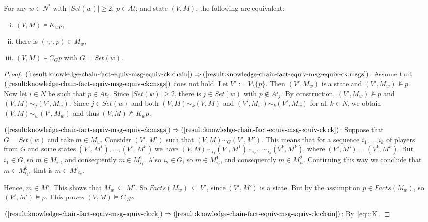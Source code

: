 \documentclass{article}
\newcommand{\abs}[1]{\lvert#1\rvert}
\newcounter{#1}
\newcommand{\sse}{\mbox{$\:\subseteq\:$}}
\newcommand{\LL}{\mbox{$\ldots$}}
\newcommand{\state}[1][]{\ensuremath{(V#1,M#1)}\xspace}
\newcommand{\setof}[1]{\ensuremath{\mathit{Set}(#1)}\xspace}
\newcommand{\msg}[3]{\ensuremath{(#1,#2,#3)}\xspace}
\newcommand{\bits}{\ensuremath{At}\xspace}
\newcommand{\knows}[1]{\ensuremath{K_{#1}}\xspace}
\newcommand{\ck}[1]{\ensuremath{C_{#1}}\xspace}\newcommand{\Facts}{\mathit{Facts}}
\begin{document}
\begin{lemma}
  \label{result:knowledge-chain-fact-equiv-msg-equiv-ck}
  For any $w\in N^*$ with $\abs{\setof w}\geq2$,
  $p\in\bits$, and state \state,
  the following are equivalent:
  \begin{enumerate}[(i)]
  \item\label{result:knowledge-chain-fact-equiv-msg-equiv-ck:chain}
    $\state\vDash \knows wp$,\item\label{result:knowledge-chain-fact-equiv-msg-equiv-ck:msgs}
there is $\msg{\cdot}{\cdot}{p}\in M_w$,
  \item\label{result:knowledge-chain-fact-equiv-msg-equiv-ck:ck}
    $\state\vDash \ck Gp$ with $G=\setof w$.
  \end{enumerate}
\end{lemma}
\begin{proof}
  $(\ref{result:knowledge-chain-fact-equiv-msg-equiv-ck:chain})\Rightarrow
  (\ref{result:knowledge-chain-fact-equiv-msg-equiv-ck:msgs})$:
Assume that $(\ref{result:knowledge-chain-fact-equiv-msg-equiv-ck:msgs})$ does not hold.
Let $V':=V\setminus\{p\}$. Then $(V',M_w)$ is a state and $(V',M_w)\nvDash p$.
  Now let $i\in N$ be such that $p\in\bits_i$.
  Since $\abs{\setof w}\geq2$, there is $j\in\setof w$ with $p\not\in\bits_j$.
  By construction, $(V',M_w)\nvDash p$ and $(V,M)\sim_j(V',M_w)$.
  Since $j\in\setof w$ and both $\state\sim_k\state$ and $(V',M_w)\sim_k(V',M_w)$ for all $k\in N$,
  we obtain $\state\sim_w(V',M_w)$ and thus $\state\nvDash \knows wp$.

  \noindent $(\ref{result:knowledge-chain-fact-equiv-msg-equiv-ck:msgs})\Rightarrow
  (\ref{result:knowledge-chain-fact-equiv-msg-equiv-ck:ck})$:
Suppose that $G=\setof w$ and take $m \in M_w$.
Consider $\state[']$ such that $\state \sim_{G} \state[']$.
This means that for a sequence
$i_1, \LL, i_k$ of players from $G$
  and some states $\state[^1], \LL, \state[^k]$
  we have $\state \sim_{i_1} \state[^1] \sim_{i_2} \LL \sim_{i_k} \state[^k]$,
  where $\state['] = \state[^k]$.
But $i_1 \in G$, so $m \in M_{i_1}$, and consequently $m \in
M^{1}_{i_1}$. Also $i_2 \in G$, so $m \in M^{1}_{i_2}$,
and consequently $m \in M^{2}_{i_2}$.  Continuing this way we conclude
that $m \in M^{k}_{i_k}$, that is $m \in M'_{i_k}$. 

Hence, $m \in M'$. This shows that $M_w \sse M'$.  So $\Facts(M_w) \sse
V'$, since $(V', M')$ is a state. But by the assumption $p \in
Facts(M_w)$, so $\state['] \vDash p$. This proves $\state \vDash \ck G
p$.

  \noindent $(\ref{result:knowledge-chain-fact-equiv-msg-equiv-ck:ck})\Rightarrow
  (\ref{result:knowledge-chain-fact-equiv-msg-equiv-ck:chain})$: By~\eqref{equ:K}.
\end{proof}
\end{document}
